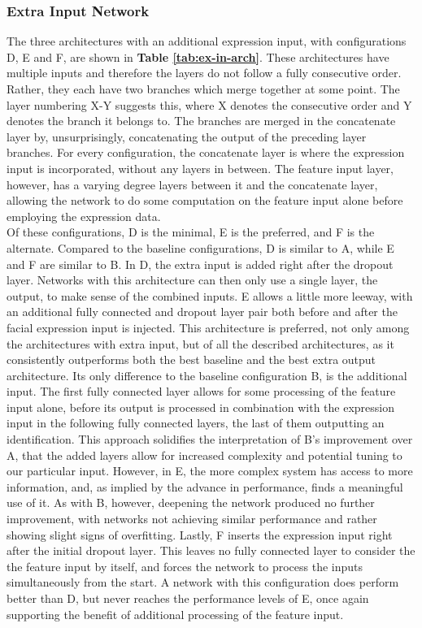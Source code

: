 \subsubsection{Extra Input Network}


The three architectures with an additional expression input, with configurations D, E and F, are shown in \textbf{Table \ref{tab:ex-in-arch}}. These architectures have multiple inputs and therefore the layers do not follow a fully consecutive order. Rather, they each have two branches which merge together at some point. The layer numbering X-Y suggests this, where X denotes the consecutive order and Y denotes the branch it belongs to. The branches are merged in the concatenate layer by, unsurprisingly, concatenating the output of the preceding layer branches. For every configuration, the concatenate layer is where the expression input is incorporated, without any layers in between. The feature input layer, however, has a varying degree layers between it and the concatenate layer, allowing the network to do some computation on the feature input alone before employing the expression data. \\

\noindent Of these configurations, D is the minimal, E is the preferred, and F is the alternate. Compared to the baseline configurations, D is similar to A, while E and F are similar to B. In D, the extra input is added right after the dropout layer. Networks with this architecture can then only use a single layer, the output, to make sense of the combined inputs. E allows a little more leeway, with an additional fully connected and dropout layer pair both before and after the facial expression input is injected. This architecture is preferred, not only among the architectures with extra input, but of all the described architectures, as it consistently outperforms both the best baseline and the best extra output architecture. Its only difference to the baseline configuration B, is the additional input. The first fully connected layer allows for some processing of the feature input alone, before its output is processed in combination with the expression input in the following fully connected layers, the last of them outputting an identification. This approach solidifies the interpretation of B's improvement over A, that the added layers allow for increased complexity and potential tuning to our particular input. However, in E, the more complex system has access to more information, and, as implied by the advance in performance, finds a meaningful use of it. As with B, however, deepening the network produced no further improvement, with networks not achieving similar performance and rather showing slight signs of overfitting. Lastly, F inserts the expression input right after the initial dropout layer. This leaves no fully connected layer to consider the the feature input by itself, and forces the network to process the inputs simultaneously from the start. A network with this configuration does perform better than D, but never reaches the performance levels of E, once again supporting the benefit of additional processing of the feature input. 

